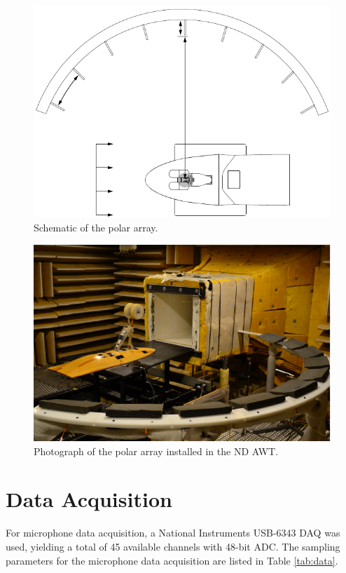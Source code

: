 \begin{figure}
	\begin{center}
		\centerline{\includegraphics[scale=1.0]{figures/array_schematic}}
		\caption{Schematic of the polar array.}
		\label{fig:array}
	\end{center}
\end{figure}

\begin{figure}
	\begin{center}
		\centerline{\includegraphics[scale=1.0]{figures/arraypic}}
		\caption{Photograph of the polar array installed in the ND AWT.}
		\label{fig:arraypic}
	\end{center}
\end{figure}


\section{Data Acquisition}
For microphone data acquisition, a National Instruments USB-6343 DAQ was used, yielding a total of 45 available channels with 48-bit ADC. The sampling parameters for the microphone data acquisition are listed in Table \ref{tab:data}.

